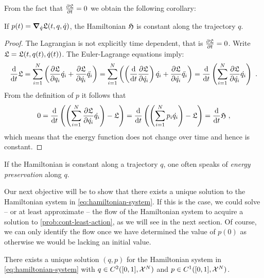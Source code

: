 From the fact that $\frac{\partial \mathfrak{L}}{\partial t} = 0$ we obtain the following corollary:
\begin{corollary}
	\label{cor:energy-preservation}
	If $p(t) = \grad_{\dot{q}} \mathfrak{L}(t, q, \dot{q})$, the Hamiltonian $\mathfrak{H}$ is constant along the trajectory $q$.
\end{corollary}
\begin{proof}
	The Lagrangian is not explicitly time dependent, that is $\frac{\partial \mathfrak{L}}{\partial t} = 0$.
	Write $\mathfrak{L} = \mathfrak{L}(t, q(t), \dot{q}(t))$.
	The Euler-Lagrange equations imply:
	\begin{equation}
		\frac{\mathrm{d}}{\mathrm{d} t} \mathfrak{L} = \sum_{i=1}^{N}\left(\frac{\partial \mathfrak{L}}{\partial q_i} \dot{q_i} + \frac{\partial \mathfrak{L}}{\partial \dot{q_i}} \ddot{q_i} \right )
		=\sum_{i=1}^{N}\left( \left( \frac{\mathrm{d}}{\mathrm{d} t} \frac{\partial \mathfrak{L}}{\partial \dot{q_i}} 
		\right)\dot{q_i}+ \frac{\partial \mathfrak{L}}{\partial \dot{q_i}} \ddot{q_i}\right )
		= \frac{\mathrm{d}}{\mathrm{d} t} \left(\sum_{i=1}^{N} \frac{\partial \mathfrak{L}}{\partial \dot{q_i}} \dot{q_i}\right) \ .
	\end{equation}
	From the definition of $p$ it follows that
	\begin{equation}
		0 = \frac{\mathrm{d}}{\mathrm{d} t} \left( \left(\sum_{i=1}^{N} \frac{\partial \mathfrak{L}}{\partial \dot{q_i}} \dot{q_i} \right) -  \mathfrak{L} \right) 
		= \frac{\mathrm{d}}{\mathrm{d} t} \left( \left(\sum_{i=1}^{N} p_i \dot{q_i} \right ) - \mathfrak{L} \right)
		= \frac{\mathrm{d}}{\mathrm{d} t} \mathfrak{H} \ ,
	\end{equation}
	which means that the energy function does not change over time and hence is constant.
\end{proof}
If the Hamiltonian is constant along a trajectory $q$, one often speaks of \emph{energy preservation} along $q$.

Our next objective will be to show that there exists a unique solution to the Hamiltonian system in \cref{eq:hamiltonian-system}.
If this is the case, we could solve -- or at least approximate -- the flow of the Hamiltonian system to acquire a solution to \cref{prob:cont-least-action}, as we will see in the next section.
Of course, we can only identify the flow once we have determined the value of $p(0)$ as otherwise we would be lacking an initial value.

\begin{theorem}
	\label{theo:hamiltonian-system-solution}
	There exists a unique solution $(q, p)$ for the Hamiltonian system in \cref{eq:hamiltonian-system} with $q \in C^2([0, 1], \mathcal{X}^N)$ and $p \in C^1([0, 1], \mathcal{X}^N)$.
\end{theorem}

